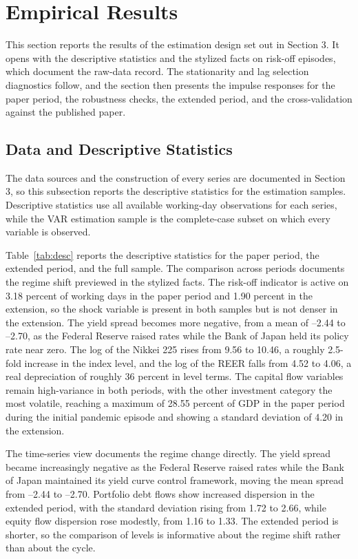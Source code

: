 \section{Empirical Results}

This section reports the results of the estimation design set out in Section 3. It opens with the descriptive statistics and the stylized facts on risk-off episodes, which document the raw-data record. The stationarity and lag selection diagnostics follow, and the section then presents the impulse responses for the paper period, the robustness checks, the extended period, and the cross-validation against the published paper.

\subsection{Data and Descriptive Statistics}

The data sources and the construction of every series are documented in Section 3, so this subsection reports the descriptive statistics for the estimation samples. Descriptive statistics use all available working-day observations for each series, while the VAR estimation sample is the complete-case subset on which every variable is observed.

Table~\ref{tab:desc} reports the descriptive statistics for the paper period, the extended period, and the full sample. The comparison across periods documents the regime shift previewed in the stylized facts. The risk-off indicator is active on 3.18 percent of working days in the paper period and 1.90 percent in the extension, so the shock variable is present in both samples but is not denser in the extension. The yield spread becomes more negative, from a mean of --2.44 to --2.70, as the Federal Reserve raised rates while the Bank of Japan held its policy rate near zero. The log of the Nikkei 225 rises from 9.56 to 10.46, a roughly 2.5-fold increase in the index level, and the log of the REER falls from 4.52 to 4.06, a real depreciation of roughly 36 percent in level terms. The capital flow variables remain high-variance in both periods, with the other investment category the most volatile, reaching a maximum of 28.55 percent of GDP in the paper period during the initial pandemic episode and showing a standard deviation of 4.20 in the extension.

The time-series view documents the regime change directly. The yield spread became increasingly negative as the Federal Reserve raised rates while the Bank of Japan maintained its yield curve control framework, moving the mean spread from --2.44 to --2.70. Portfolio debt flows show increased dispersion in the extended period, with the standard deviation rising from 1.72 to 2.66, while equity flow dispersion rose modestly, from 1.16 to 1.33. The extended period is shorter, so the comparison of levels is informative about the regime shift rather than about the cycle.


